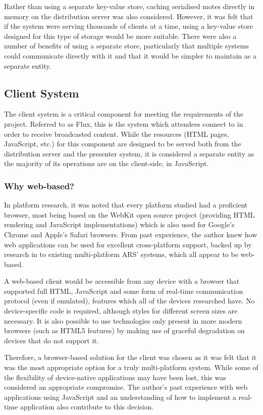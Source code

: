 \documentclass[a4papert,11pt,notitlepage]{article}
\begin{document}
Rather than using a separate key-value store, caching serialised motes directly in memory on the distribution server was also considered. However, it was felt that if the system were serving thousands of clients at a time, using a key-value store designed for this type of storage would be more suitable. There were also a number of benefits of using a separate store, particularly that multiple systems could communicate directly with it and that it would be simpler to maintain as a separate entity.

\subsection{Client System}
The client system is a critical component for meeting the requirements of the project. Referred to as Flux, this is the system which attendees connect to in order to receive broadcasted content.
While the resources (HTML pages, JavaScript, etc.) for this component are designed to be served both from the distribution server and the presenter system, it is considered a separate entity as the majority of its operations are on the client-side, in JavaScript.

\subsubsection{Why web-based?}
In platform research, it was noted that every platform studied had a proficient browser, most being based on the WebKit\cite{webkit:web} open source project (providing HTML rendering and JavaScript implementations) which is also used for Google's Chrome and Apple's Safari browsers. From past experience, the author knew how web applications can be used for excellent cross-platform support, backed up by research in to existing multi-platform ARS' systems, which all appear to be web-based. 

A web-based client would be accessible from any device with a browser that supported full HTML, JavaScript and some form of real-time communication protocol (even if emulated), features which all of the devices researched have. No device-specific code is required, although styles for different screen sizes are necessary. It is also possible to use technologies only present in more modern browsers (such as HTML5 features) by making use of graceful degradation on devices that do not support it.

Therefore, a browser-based solution for the client was chosen as it was felt that it was the most appropriate option for a truly multi-platform system. While some of the flexibility of device-native applications may have been lost, this was considered an appropriate compromise. The author's past experience with web applications using JavaScript and an understanding of how to implement a real-time application also contribute to this decision.
\end{document}
